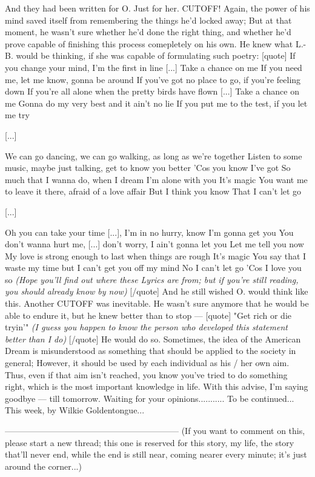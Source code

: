 And they had been written for O. 
Just for her. 
CUTOFF!
Again, the power of his mind saved itself from remembering the things he'd locked away; But at that moment, he wasn't sure whether he'd done the right thing, and whether he'd prove capable of finishing this process comepletely on his own. 
He knew what L.-B. would be thinking, if she was capable of formulating such poetry:
[quote]
If you change your mind, I'm the first in line 
[...]
Take a chance on me 
If you need me, let me know, gonna be around 
If you've got no place to go, if you're feeling down 
If you're all alone when the pretty birds have flown 
[...]
Take a chance on me 
Gonna do my very best and it ain't no lie 
If you put me to the test, if you let me try 
 
[...]
 
We can go dancing, we can go walking, as long as we're together 
Listen to some music, maybe just talking, get to know you better 
'Cos you know I've got 
So much that I wanna do, when I dream I'm alone with you 
It's magic 
You want me to leave it there, afraid of a love affair 
But I think you know 
That I can't let go 
 
[...]
 
Oh you can take your time [...], I'm in no hurry, know I'm gonna get you 
You don't wanna hurt me, [...] don't worry, I ain't gonna let you 
Let me tell you now 
My love is strong enough to last when things are rough 
It's magic 
You say that I waste my time but I can't get you off my mind 
No I can't let go 
'Cos I love you so 
\emph{(Hope you'll find out where these Lyrics are from; but if you're still reading, you should already know by now)}
[/quote]
And he still wished O. would think like this. 
Another CUTOFF was inevitable. 
He wasn't sure anymore that he would be able to endure it, but he knew better than to stop --- 
[quote]
"Get rich or die tryin'"
\emph{(I guess you happen to know the person who developed this statement better than I do)}
[/quote]
He would do so. 
Sometimes, the idea of the American Dream is misunderstood as something that should be applied to the society in general; However, it should be used by each individual as his / her own aim. 
Thus, even if that aim isn't reached, you know you've tried to do something right, which is the most important knowledge in life. 
With this advise, I'm saying goodbye --- till tomorrow. 
Waiting for your opinions...........
To be continued...
This week, by Wilkie Goldentongue...

--------------------------------------------------------------
(If you want to comment on this, please start a new thread; this one is reserved for this story, my life, the story that'll never end, while the end is still near, coming nearer every minute; it's just around the corner...)

